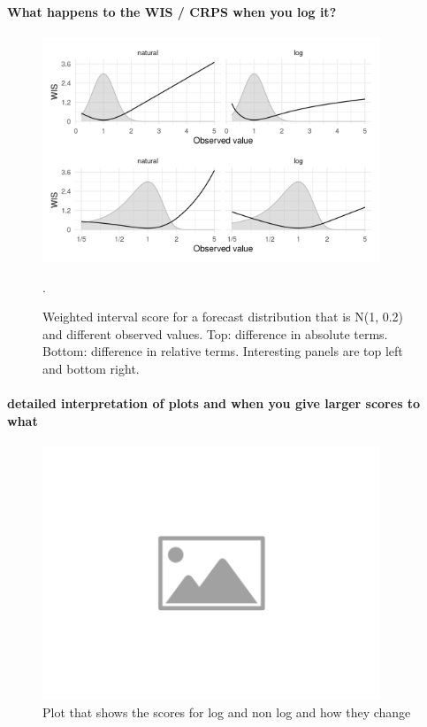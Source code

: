\documentclass{article}
\begin{document}
\paragraph{What happens to the WIS / CRPS when you log it?}
\begin{figure}[h!]
    \centering
    \includegraphics[width=0.9\textwidth]{output/figures/SIM-effect-log-score.png}
    \caption{Weighted interval score for a forecast distribution that is N(1, 0.2) and different observed values. Top: difference in absolute terms. Bottom: difference in relative terms. Interesting panels are top left and bottom right.}. 
    \label{fig:log-crps-viz}
\end{figure}




\paragraph{detailed interpretation of plots and when you give larger scores to what}

\begin{figure}[h!]
    \centering
    \includegraphics[width=0.9\textwidth]{output/placeholder-image.png}
    \caption{Plot that shows the scores for log and non log and how they change}
    \label{fig:change-in-scores}
\end{figure}
\end{document}
